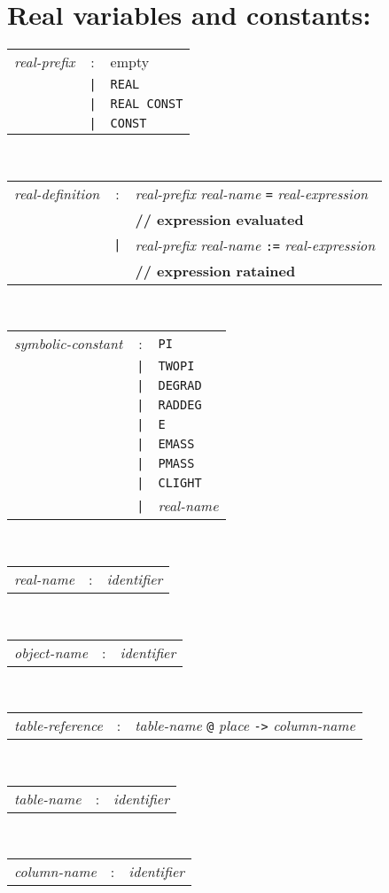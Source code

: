 \section*{Real variables and constants:}
\begin{tabular}{p{4cm}cl}
\textit{real-prefix}
  &:& empty \\
  &\texttt{|}& \texttt{REAL} \\
  &\texttt{|}& \texttt{REAL CONST} \\
  &\texttt{|}& \texttt{CONST}
\end{tabular}
\\
\begin{tabular}{p{4cm}cl}
\textit{real-definition}
  &:& \textit{real-prefix} \textit{real-name} \texttt{=}
    \textit{real-expression} \\
 & &\textbf{// expression evaluated} \\
  &\texttt{|}& \textit{real-prefix} \textit{real-name} \texttt{:=}
    \textit{real-expression} \\
 & &\textbf{// expression ratained}
\end{tabular}
\\
\begin{tabular}{p{4cm}cl}
\textit{symbolic-constant}
  &:& \texttt{PI} \\
  &\texttt{|}& \texttt{TWOPI} \\
  &\texttt{|}& \texttt{DEGRAD} \\
  &\texttt{|}& \texttt{RADDEG} \\
  &\texttt{|}& \texttt{E} \\
  &\texttt{|}& \texttt{EMASS} \\
  &\texttt{|}& \texttt{PMASS} \\
  &\texttt{|}& \texttt{CLIGHT} \\
  &\texttt{|}& \textit{real-name}
\end{tabular}
\\
\begin{tabular}{p{4cm}cl}
\textit{real-name}
  &:& \textit{identifier}
\end{tabular}
\\
\begin{tabular}{p{4cm}cl}
\textit{object-name}
  &:& \textit{identifier}
\end{tabular}
\\
\begin{tabular}{p{4cm}cl}
\textit{table-reference}
  &:& \textit{table-name} \texttt{@} \textit{place} \texttt{->}
    \textit{column-name}
\end{tabular}
\\
\begin{tabular}{p{4cm}cl}
\textit{table-name}
  &:& \textit{identifier}
\end{tabular}
\\
\begin{tabular}{p{4cm}cl}
\textit{column-name}
  &:& \textit{identifier}
\end{tabular}

